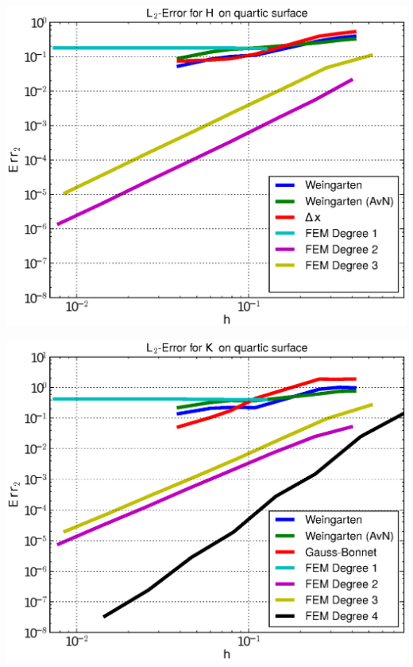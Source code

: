 \documentclass[handout]{beamer}
\begin{document}
\begin{frame}
\begin{overprint}
\begin{minipage}[t]{0.49\textwidth}
            \centering\includegraphics[width=\textwidth]{bilder/Curvature/heineB/ErrHL2_6.eps}
          \end{minipage}
          \begin{minipage}[t]{0.49\textwidth}
            \centering\includegraphics[width=\textwidth]{bilder/Curvature/heineB/ErrKL2_7.eps}
          \end{minipage}\hfill
          \begin{minipage}[t]{0.49\textwidth}

\end{minipage}
\end{overprint}
\end{frame}
\end{document}
